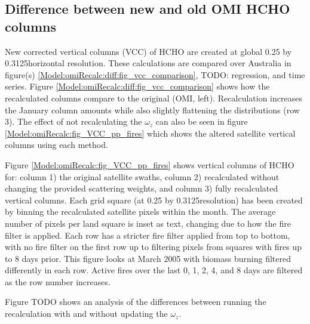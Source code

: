   \subsection{Difference between new and old OMI HCHO columns}
  
    
    New corrected vertical columns (VCC) of HCHO are created at global 0.25 by 0.3125\degr horizontal resolution.
    These calculations are compared over Australia in figure(s) \ref{Model:omiRecalc:diff:fig_vcc_comparison}, TODO: regression, and time series.
    Figure \ref{Model:omiRecalc:diff:fig_vcc_comparison} shows how the recalculated columns compare to the original (OMI, left). 
    Recalculation increases the January column amounts while also slightly flattening the distributions (row 3).
    The effect of not recalculating the $\omega_z$ can also be seen in figure \ref{Model:omiRecalc:fig_VCC_pp_fires} which shows the altered satellite vertical columns using each method.
    
    Figure \ref{Model:omiRecalc:fig_VCC_pp_fires} shows vertical columns of HCHO for: column 1) the original satellite swaths, column 2) recalculated without changing the provided scattering weights, and column 3) fully recalculated vertical columns. 
    Each grid square (at 0.25 by 0.3125\degr resolution) has been created by binning the recalculated satellite pixels within the month.
    The average number of pixels per land square is inset as text, changing due to how the fire filter is applied.
    Each row has a stricter fire filter applied from top to bottom, with no fire filter on the first row up to filtering pixels from squares with fires up to 8 days prior.
    This figure looks at March 2005 with biomass burning filtered differently in each row.
    Active fires over the last 0, 1, 2, 4, and 8 days are filtered as the row number increases.
    
    
    Figure TODO shows an analysis of the differences between running the recalculation with and without updating the $\omega_z$.
    
